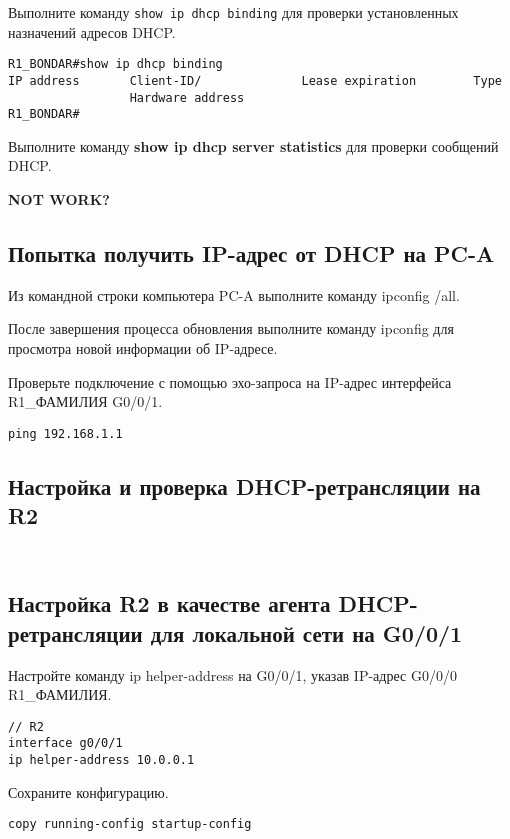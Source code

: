 Выполните команду \texttt{show ip dhcp binding}
для проверки установленных назначений адресов DHCP.

\begin{verbatim}
R1_BONDAR#show ip dhcp binding 
IP address       Client-ID/              Lease expiration        Type
                 Hardware address
R1_BONDAR#
\end{verbatim}

Выполните команду \textbf{show ip dhcp server statistics}
для проверки сообщений DHCP.

\textbf{NOT WORK?}

\subsection{Попытка получить IP-адрес от DHCP на PC-A}

Из командной строки компьютера PC-A выполните команду ipconfig /all.

После завершения процесса обновления выполните команду ipconfig для просмотра новой информации об IP-адресе.

Проверьте подключение с помощью эхо-запроса
на IP-адрес интерфейса R1\_ФАМИЛИЯ G0/0/1.

\begin{verbatim}
ping 192.168.1.1
\end{verbatim}

\subsection{Настройка и проверка DHCP-ретрансляции на R2}

\subsection{\\Настройка R2 в качестве агента DHCP-ретрансляции
	для локальной сети на G0/0/1}

Настройте команду ip helper-address на G0/0/1,
указав IP-адрес G0/0/0 R1\_ФАМИЛИЯ.

\begin{verbatim}
// R2
interface g0/0/1
ip helper-address 10.0.0.1
\end{verbatim}

Сохраните конфигурацию.

\begin{verbatim}
copy running-config startup-config
\end{verbatim}


